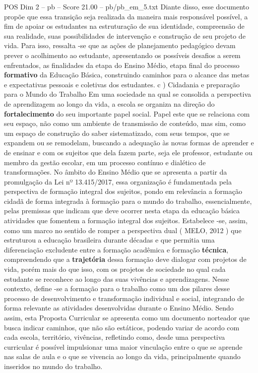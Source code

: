 \begin{textsample}{POS Dim 2 – pb – Score 21.00 – pb/pb\_em\_5.txt}
Diante disso, esse documento propõe que essa transição seja realizada da maneira mais responsável possível, a fim de apoiar os estudantes na estruturação de sua identidade, compreensão de sua realidade, suas possibilidades de intervenção e construção de seu projeto de vida.
Para isso, ressalta -se que as ações de planejamento pedagógico devam prever o acolhimento ao estudante, apresentando os possíveis desafios a serem enfrentados, as finalidades da etapa do Ensino Médio, etapa final do processo \textbf{formativo} da Educação Básica, construindo caminhos para o alcance das metas e expectativas pessoais e coletivas dos estudantes. c ) Cidadania e preparação para o Mundo do Trabalho Em uma sociedade na qual se consolida a perspectiva de aprendizagem ao longo da vida, a escola se organiza na direção do \textbf{fortalecimento} do seu importante papel social.
Papel este que se relaciona com seu espaço, não como um ambiente de transmissão de conteúdo, mas sim, como um espaço de construção do saber sistematizado, com seus tempos, que se expandem ou se remodelam, buscando a adequação às novas formas de aprender e de ensinar e com os sujeitos que dela fazem parte, seja ele professor, estudante ou membro da gestão escolar, em um processo contínuo e dialético de transformações.
No âmbito do Ensino Médio que se apresenta a partir da promulgação da Lei nº 13.415/2017, essa organização é fundamentada pela perspectiva de formação integral dos sujeitos, pondo em relevância a formação cidadã de forma integrada à formação para o mundo do trabalho, essencialmente, pelas premissas que indicam que deve ocorrer nesta etapa da educação básica atividades que fomentem a formação integral dos sujeitos.
Estabelece -se, assim, como um marco no sentido de romper a perspectiva dual ( MELO, 2012 ) que estruturou a educação brasileira durante décadas e que permitia uma diferenciação excludente entre a formação acadêmica e formação \textbf{técnica}, compreendendo que a \textbf{trajetória} dessa formação deve dialogar com projetos de vida, porém mais do que isso, com os projetos de sociedade no qual cada estudante se reconhece ao longo das suas vivências e aprendizagens.
Nesse contexto, define -se a formação para o trabalho como um dos pilares desse processo de desenvolvimento e transformação individual e social, integrando de forma relevante as atividades desenvolvidas durante o Ensino Médio.
Sendo assim, esta Proposta Curricular se apresenta como um documento norteador que busca indicar caminhos, que não são estáticos, podendo variar de acordo com cada escola, território, vivências, refletindo como, desde uma perspectiva curricular é possível impulsionar uma maior vinculação entre o que se aprende nas salas de aula e o que se vivencia ao longo da vida, principalmente quando inseridos no mundo do trabalho.

\end{textsample}
